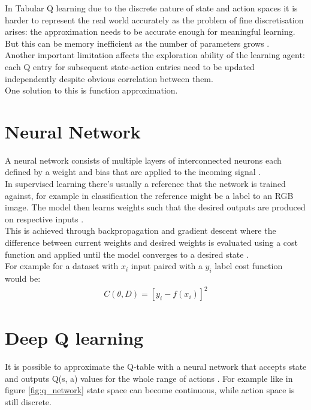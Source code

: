 In Tabular Q learning due to the discrete nature of 
state and action spaces it is harder to represent the real world accurately as the problem of fine discretisation arises: the approximation needs to be accurate enough for meaningful learning. But this can be memory inefficient as the number of parameters grows \cite{lecture_intro_to_deep_rl}. \\

Another important limitation affects the exploration ability of the learning agent: each Q entry for subsequent state-action entries need to be updated independently despite obvious correlation between them.\\

One solution to this is function approximation. 

\section{Neural Network}

A neural network consists of multiple layers of interconnected neurons each defined by a weight and bias that are applied to the incoming signal \cite{lecture_intro_to_deep_rl}.\\

In supervised learning there's usually a reference that 
the network is trained against, for example in classification the reference might be a label to an RGB image. The model then learns weights such that the desired outputs are produced on respective inputs \cite{lecture_intro_to_deep_rl} . \\

This is achieved through backpropagation and gradient
descent where the difference between current weights and
desired weights is evaluated using a cost function and
applied until the model converges to a desired state
\cite{lecture_intro_to_deep_rl} .\\

For example for a dataset with $x_i$ input paired with a $y_i$ label cost function would be: 
\begin{align}
    C(\theta, D) = [y_i - f(x_i)]^2
\end{align}

\section{Deep Q learning}

It is possible to approximate the Q-table with a neural network that accepts state and outputs Q(s, a) 
values for the whole range of actions \cite{lecture_intro_to_deep_rl}. For example like in 
figure \ref{fig:q_network} state space can become continuous, while action space is still discrete.

